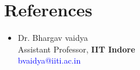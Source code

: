 \documentclass[11pt,a4paper,roman]{moderncv}
\begin{document}
    \section{References}
    \vspace{6pt}
    \begin{itemize}
    \item{Dr. Bhargav vaidya\\Assistant Professor, \textbf{IIT Indore}\\\textcolor{blue}{bvaidya@iiti.ac.in}}
    \end{itemize}

    \nocite{*}
    
                     
    
\end{document}
